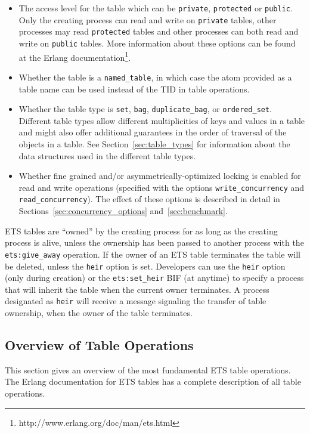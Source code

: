 \documentclass[aps,pre,preprint,nofootinbib]{revtex4}
\begin{document}
\begin{itemize}
\item
  The access level for the table which can be \verb|private|, \verb|protected| or \verb|public|.
  Only the creating process can read and write on \verb|private| tables, other processes may read \verb|protected| tables and other processes can both read and write on \verb|public| tables.
  More information about these options can be found at the Erlang documentation\footnote{http://www.erlang.org/doc/man/ets.html}.
\item
  Whether the table is a \verb|named_table|, in which case the atom provided as a table name can be used instead of the TID in table operations.
\item
  Whether the table type is \verb|set|, \verb|bag|, \verb|duplicate_bag|, or \verb|ordered_set|.
  Different table types allow different multiplicities of keys and values in a table and might also offer additional guarantees in the order of traversal of the objects in a table.
  See Section~\ref{sec:table_types} for information about the data structures used in the different table types.
\item
  Whether fine grained and/or asymmetrically-optimized locking is enabled for read and write operations (specified with the options \verb|write_concurrency| and \verb|read_concurrency|).
  The effect of these options is described in detail in Sections~\ref{sec:concurrency_options} and~\ref{sec:benchmark}.
\end{itemize}

ETS tables are ``owned'' by the creating process for as long as the creating process is alive, unless the ownership has been passed to another process with the \verb|ets:give_away| operation.
If the owner of an ETS table terminates the table will be deleted, unless the \verb|heir| option is set.
Developers can use the \verb|heir| option (only during creation) or the \verb|ets:set_heir| BIF (at anytime) to specify a process that will inherit the table when the current owner terminates.
A process designated as \verb|heir| will receive a message signaling the transfer of table ownership, when the owner of the table terminates.

\subsection{Overview of Table Operations}

This section gives an overview of the most fundamental ETS table operations.
The Erlang documentation for ETS tables has a complete description of all table operations.
\end{document}
